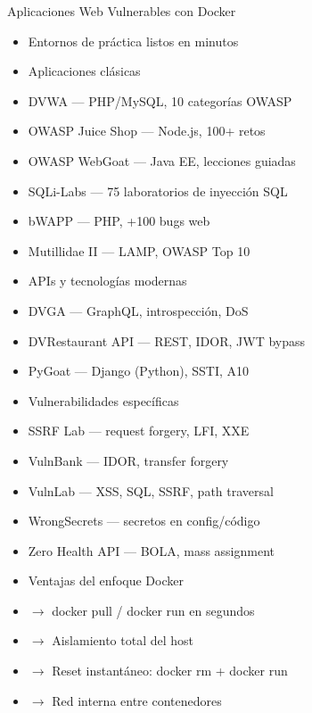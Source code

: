 \documentclass[aspectratio=169,11pt]{beamer}
\begin{document}
\begin{frame}[allowframebreaks]{Aplicaciones Web Vulnerables con Docker}
\small
  \begin{itemize}
  \item Entornos de práctica listos en minutos
  \item Aplicaciones clásicas
  \item DVWA --- PHP/MySQL, 10 categorías OWASP
  \item OWASP Juice Shop --- Node.js, 100+ retos
  \item OWASP WebGoat --- Java EE, lecciones guiadas
  \item SQLi-Labs --- 75 laboratorios de inyección SQL
  \item bWAPP --- PHP, +100 bugs web
  \item Mutillidae II --- LAMP, OWASP Top 10
  \item APIs y tecnologías modernas
  \item DVGA --- GraphQL, introspección, DoS
  \item DVRestaurant API --- REST, IDOR, JWT bypass
  \item PyGoat --- Django (Python), SSTI, A10
  \item Vulnerabilidades específicas
  \item SSRF Lab --- request forgery, LFI, XXE
  \item VulnBank --- IDOR, transfer forgery
  \item VulnLab --- XSS, SQL, SSRF, path traversal
  \item WrongSecrets --- secretos en config/código
  \item Zero Health API --- BOLA, mass assignment
  \item Ventajas del enfoque Docker
  \item $\rightarrow$ docker pull / docker run en segundos
  \item $\rightarrow$ Aislamiento total del host
  \item $\rightarrow$ Reset instantáneo: docker rm + docker run
  \item $\rightarrow$ Red interna entre contenedores
  \end{itemize}
\end{frame}
\end{document}
